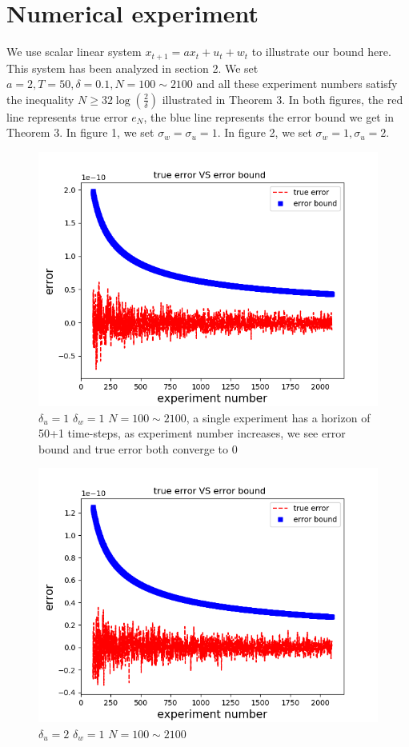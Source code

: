 \documentclass{article}[12pt]
\begin{document}
\section{Numerical experiment}

 We use scalar linear system $x_{t+1} = ax_t + u_t + w_t$ to illustrate our bound here. This system has been analyzed in section 2. We set $a=2, T=50,  \delta=0.1, N=100\sim 2100$ and all these experiment numbers  satisfy the inequality $N\geq 32\log(\frac{2}{\delta})$ illustrated in Theorem 3. In both figures, the red line represents true error $e_N$, the blue line represents the error bound we get in Theorem 3. In figure 1, we set $ \sigma_w = \sigma_u = 1  $. In figure 2, we set $ \sigma_w = 1, \sigma_u = 2.  $
  
 \begin{figure}
    \centering
    \includegraphics[width = 1.0\textwidth]{1.png}
    \caption{ $\delta_u=1$ $\delta_w=1$ $N=100\sim 2100$, a single experiment has a horizon of 50+1 time-steps, as experiment number increases, we see error bound and true error both converge to 0}
    \label{fig:my_label}
\end{figure}

\begin{figure}
    \centering
    \includegraphics[width = 1.0\textwidth]{2.png}
    \caption{$\delta_u=2$ $\delta_w=1$ $N=100\sim 2100$}
    \label{fig:my_label}
\end{figure}
 
\end{document}
